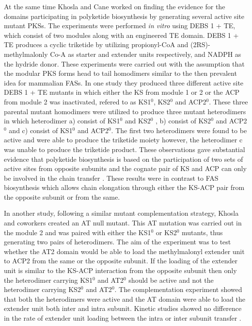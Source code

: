  			At the same time Khosla and Cane worked on finding the evidence for the domains participating in polyketide biosynthesis by generating several active site mutant PKSs. The experiments were performed \textit{in vitro} using DEBS 1 + TE, which consist of two modules along with an engineered TE domain. DEBS 1 + TE produces a cyclic triketide by utilizing propionyl-CoA and (2RS)-methylmalonly Co-A as starter and extender units respectively, and NADPH as the hydride donor. These experiments were carried out with the assumption that the modular PKS forms head to tail homodimers similar to the then prevalent idea for  mammalian FASs. In one study they produced three different active site DEBS 1 + TE mutants in which either the KS from module 1 or 2 or the ACP from module 2 was inactivated, refered to as KS1$ ^{0} $, KS2$ ^{0} $ and ACP2$ ^{0} $. These three parental mutant homodimers were utilized to produce three mutant heterodimers in which heterodimer a) consist of KS1$^{0}$ and KS2$^{0}$ , b) consist of KS2$^{0}$ and ACP2$^{0}$ and c) consist of KS1$^{0}$ and ACP2$^{0}$. The first two heterodimers were found to be active and were able to produce the triketide moiety however, the heterodimer c was unable to produce the triketide product. These observations gave substantial evidence that polyketide biosynthesis is based on the participation of two sets of active sites from opposite subunits and the cognate pair of KS and ACP can only be involved in the chain transfer \parencite{Kao1996}. These results were in contrast to FAS biosynthesis which allows chain elongation through either the KS-ACP pair from the opposite subunit or from the same. 
 			
 			In another study, following a similar mutant complementation strategy, Khosla and coworkers created an AT null mutant. This AT mutation was carried out in the module 2 and was paired with either the KS1$^{0}$ or KS2$^{0}$ mutants, thus generating two pairs of heterodimers. The aim of the experiment was to test whether the AT2 domain would be able to load the methylmalonyl extender unit to ACP2 from the same or the opposite subunit. If the loading of the extender unit is similar to the KS-ACP interaction from the opposite subunit then only the heterodimer carrying KS1$^{0}$ and AT2$^{0}$ should be active and not the heterodimer carrying KS2$^{0}$ and AT2$^{0}$. The complementation experiment showed that both the heterodimers were active and the AT domain were able to load the extender unit both inter and intra subunit. Kinetic studies showed no difference in the rate of extender unit loading  between the intra or inter subunit transfer \parencite{Gokhale1998}. 
 			
